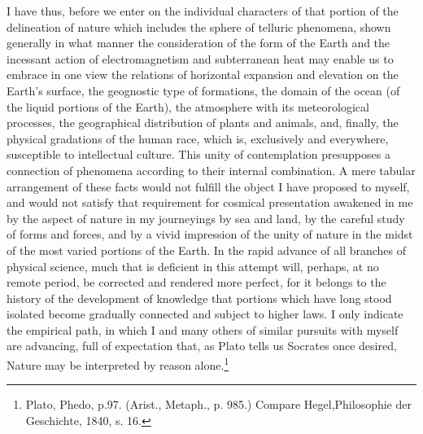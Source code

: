 I have thus, before we enter on the individual characters of that portion of the delineation of nature which includes the sphere of telluric phenomena, shown generally in what manner the consideration of the form of the Earth and the incessant action of electromagnetism and subterranean heat may enable us to embrace in one view the relations of horizontal expansion and elevation on the Earth's surface, the geognostic type of formations, the domain of the ocean (of the liquid portions of the Earth), the atmosphere with its meteorological processes, the geographical distribution of plants and animals, and, finally, the physical gradations of the human race, which is, exclusively and everywhere, susceptible to intellectual culture. This unity of contemplation presupposes a connection of phenomena according to their internal combination. A mere tabular arrangement of these facts would not fulfill the object I have proposed to myself, and would not satisfy that requirement for cosmical presentation awakened in me by the aspect of nature in my journeyings by sea and land, by the careful study of forms and forces, and by a vivid impression of the unity of nature in the midst of the most varied portions of the Earth. In the rapid advance of all branches of physical science, much that is deficient in this attempt will, perhaps, at no remote period, be corrected and rendered more perfect, for it belongs to the history of the development of knowledge that portions which have long stood isolated become gradually connected and subject to higher laws. I only indicate the empirical path, in which I and many others of similar pursuits with myself are advancing, full of expectation that, as Plato tells us Socrates once desired, Nature may be interpreted by reason alone.\footnote{Plato, Phedo, p.97. (Arist., Metaph., p. 985.) Compare Hegel,Philosophie der Geschichte, 1840, s. 16.}
